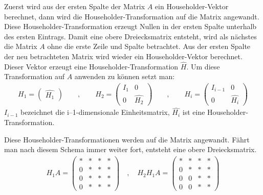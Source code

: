 Zuerst wird aus der ersten Spalte der Matrix $A$ ein Householder-Vektor berechnet, dann wird die Householder-Transformation auf die Matrix angewandt.
Diese Householder-Transformation erzeugt Nullen in der ersten Spalte unterhalb des ersten Eintrags.
Damit eine obere Dreiecksmatrix entsteht, wird als nächstes die Matrix $A$ ohne die erste Zeile und Spalte betrachtet. Aus der ersten Spalte der neu betrachteten Matrix wird wieder ein Householder-Vektor berechnet.
Dieser Vektor erzeugt eine Householder-Transformation $\hat{H}$.
Um diese Transformation auf $A$ anwenden zu können setzt man:
\begin{align*}
H_1 = \begin{pmatrix}
\hat{H_1} 
\end{pmatrix} \qquad , \qquad
H_2 = \left(\begin{array}{l|l}
I_{1} & 0\\ \hline
0 & \hat{H_2} 	
\end{array} \right)\qquad , \qquad
H_i = \left(\begin{array}{l|l}
I_{i-1} & 0\\ \hline
0 & \hat{H_i} 	
\end{array} \right)
\end{align*}
$I_{i-1}$ bezeichnet die i--1-dimensionale Einheitsmatrix, $\hat{H_i}$ ist eine Householder-Transformation.


Diese Householder-Transformationen werden auf die Matrix angewandt.
Fährt man nach diesem Schema immer weiter fort, entsteht eine obere Dreiecksmatrix.
\begin{align*}
	H_1 A= \left( 
	\begin{array}{cccc}
	* & * & * & * \\ 
	0 & * & * & * \\ 
	0 & * & * & * \\ 
	0 & * & * & *
	\end{array}
	\right)
	\quad , \quad
	H_2 H_1 A= \left( 
	\begin{array}{cccc}
	* & * & * & * \\ 
	0 & * & * & * \\ 
	0 & 0 & * & * \\ 
	0 & 0 & * & *
	\end{array}
	\right)
\end{align*} 


